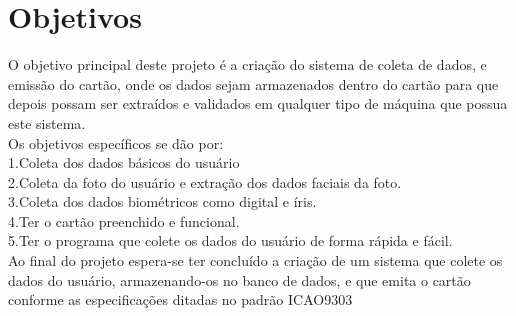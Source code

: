 \documentclass{article}
\begin{document}
	\section{Objetivos}
		\begin{flushleft}
			
				\hspace{2cm}O objetivo principal deste projeto é a criação do sistema de coleta de dados, e emissão do cartão, onde os dados sejam armazenados dentro do cartão para que depois possam ser extraídos e validados em qualquer tipo de máquina que possua este sistema.\\
				\hspace{2cm}Os objetivos específicos se dão por:\\
					\hspace{3cm}1.Coleta dos dados básicos do usuário\cite{ICAO}\cite{SASSO}\\
					\hspace{3cm}2.Coleta da foto do usuário e extração dos dados faciais da foto\cite{ISO}\cite{ICAO}.\\
					\hspace{3cm}3.Coleta dos dados biométricos como digital e íris.\\
					\hspace{3cm}4.Ter o cartão preenchido e funcional.\\
					\hspace{3cm}5.Ter o programa que colete os dados do usuário de forma rápida e fácil.\\
				 \hspace{2cm}Ao final do projeto espera-se ter concluído a criação de um sistema que colete os dados do usuário, armazenando-os no banco de dados, e que emita o cartão conforme as especificações ditadas no padrão ICAO9303

			
		\end{flushleft}
\end{document}
